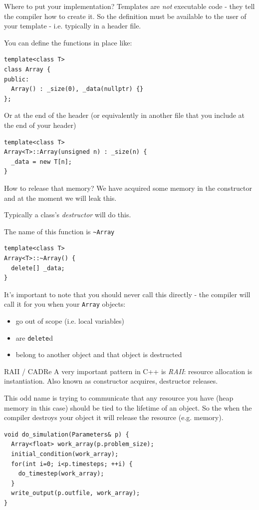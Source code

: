 \documentclass[presentation,t]{beamer}
\newcommand{\code}[1]{\lstinline!#1!}
\begin{document}
\begin{frame}[fragile]{Where to put your implementation?}
  Templates are \emph{not} executable code - they tell the compiler
  how to create it. So the definition must be available to the user of
  your template - i.e. typically in a header file.
  
  You can define the functions in place like:
\begin{lstlisting}
template<class T>
class Array {
public:
  Array() : _size(0), _data(nullptr) {}
};
\end{lstlisting}
  Or at the end of the header (or equivalently in another file that
  you include at the end of your header)
\begin{lstlisting}
template<class T>
Array<T>::Array(unsigned n) : _size(n) {
  _data = new T[n];
}
\end{lstlisting}
  
\end{frame}

\begin{frame}[fragile]{How to release that memory?}
  We have acquired some memory in the constructor and at the moment we
  will leak this.
  
  Typically a class's \emph{destructor} will do this.
  
  The name of this function is \texttt{\~\!Array}
\begin{lstlisting}
template<class T>
Array<T>::~Array() {
  delete[] _data;
}
\end{lstlisting}
  
  It's important to note that you should never call this directly -
  the compiler will call it for you when your \code{Array} objects:
  \begin{itemize}
  \item go out of scope (i.e. local variables)
  \item are \code{delete}d
  \item belong to another object and that object is destructed
  \end{itemize}
\end{frame}

\begin{frame}[fragile]{RAII / CADRe}
  A very important pattern in C++ is \emph{RAII}: resource allocation
  is instantiation. Also known as constructor acquires, destructor
  releases.

  This odd name is trying to communicate that any resource you have
  (heap memory in this case) should be tied to the lifetime of an
  object. So the when the compiler destroys your object it will release
  the resource (e.g. memory).

\begin{lstlisting}
void do_simulation(Parameters& p) {
  Array<float> work_array(p.problem_size);
  initial_condition(work_array);
  for(int i=0; i<p.timesteps; ++i) {
    do_timestep(work_array);
  }
  write_output(p.outfile, work_array);
}
\end{lstlisting}
\end{frame}
\end{document}
